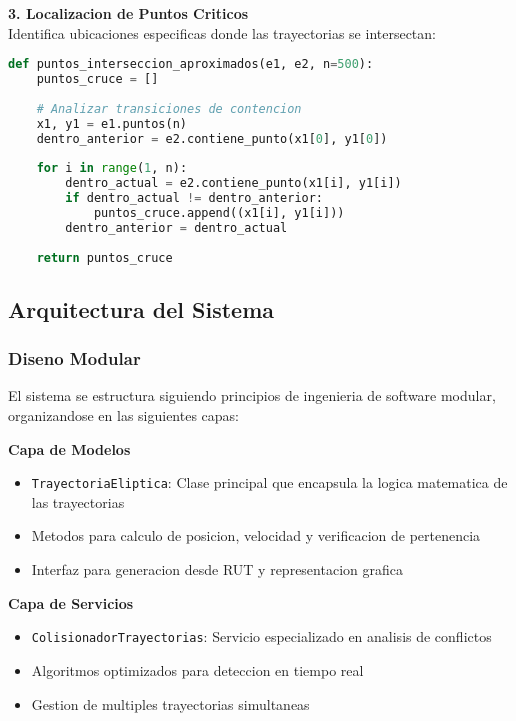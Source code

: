 \documentclass[12pt,a4paper]{article}
\begin{document}
\textbf{3. Localizacion de Puntos Criticos}\\

Identifica ubicaciones especificas donde las trayectorias se intersectan:

\begin{lstlisting}[language=Python, caption=Algoritmo de puntos de interseccion]
def puntos_interseccion_aproximados(e1, e2, n=500):
    puntos_cruce = []
    
    # Analizar transiciones de contencion
    x1, y1 = e1.puntos(n)
    dentro_anterior = e2.contiene_punto(x1[0], y1[0])
    
    for i in range(1, n):
        dentro_actual = e2.contiene_punto(x1[i], y1[i])
        if dentro_actual != dentro_anterior:
            puntos_cruce.append((x1[i], y1[i]))
        dentro_anterior = dentro_actual
    
    return puntos_cruce
\end{lstlisting}

\subsection{Arquitectura del Sistema}

\subsubsection{Diseno Modular}

El sistema se estructura siguiendo principios de ingenieria de software modular, organizandose en las siguientes capas:

\textbf{Capa de Modelos}
\begin{itemize}
    \item \texttt{TrayectoriaEliptica}: Clase principal que encapsula la logica matematica de las trayectorias
    \item Metodos para calculo de posicion, velocidad y verificacion de pertenencia
    \item Interfaz para generacion desde RUT y representacion grafica
\end{itemize}

\textbf{Capa de Servicios}
\begin{itemize}
    \item \texttt{ColisionadorTrayectorias}: Servicio especializado en analisis de conflictos
    \item Algoritmos optimizados para deteccion en tiempo real
    \item Gestion de multiples trayectorias simultaneas
\end{itemize}
\end{document}
